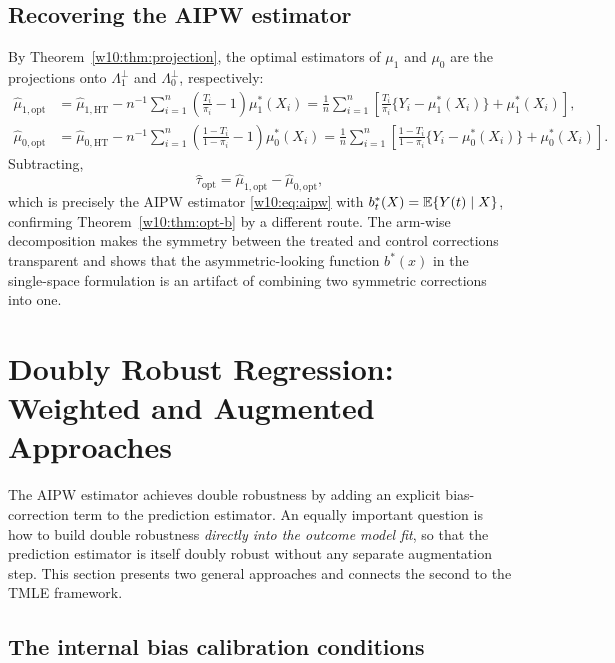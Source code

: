 \documentclass[master.tex]{subfiles}
\begin{document}
\subsection{Recovering the AIPW estimator}
\label{w10:subsec:proj-recover}

By Theorem~\ref{w10:thm:projection}, the optimal estimators of
$\mu_1$ and $\mu_0$ are the projections onto $\Lambda_1^\perp$ and
$\Lambda_0^\perp$, respectively:
\begin{align*}
  \hat\mu_{1,\mathrm{opt}}
  &= \hat\mu_{1,\mathrm{HT}}
     - n^{-1}\!\sum_{i=1}^n\!\left(\frac{T_i}{\pi_i}-1\right)\mu_1^*(X_i)
   = \frac{1}{n}\sum_{i=1}^n
     \left[\frac{T_i}{\pi_i}\{Y_i-\mu_1^*(X_i)\}+\mu_1^*(X_i)\right], \\
  \hat\mu_{0,\mathrm{opt}}
  &= \hat\mu_{0,\mathrm{HT}}
     - n^{-1}\!\sum_{i=1}^n\!\left(\frac{1-T_i}{1-\pi_i}-1\right)\mu_0^*(X_i)
   = \frac{1}{n}\sum_{i=1}^n
     \left[\frac{1-T_i}{1-\pi_i}\{Y_i-\mu_0^*(X_i)\}+\mu_0^*(X_i)\right].
\end{align*}
Subtracting,
\[
  \hat\tau_{\mathrm{opt}}
  = \hat\mu_{1,\mathrm{opt}} - \hat\mu_{0,\mathrm{opt}},
\]
which is precisely the AIPW estimator \eqref{w10:eq:aipw} with
$b_t^*(X) = \mathbb{E}\{Y(t)\mid X\}$, confirming
Theorem~\ref{w10:thm:opt-b} by a different route.  The arm-wise
decomposition makes the symmetry between the treated and control
corrections transparent and shows that the asymmetric-looking
function $b^*(x)$ in the single-space formulation is an artifact of
combining two symmetric corrections into one.

\section{Doubly Robust Regression: Weighted and Augmented Approaches}
\label{w10:sec:ibc}

The AIPW estimator achieves double robustness by adding an explicit
bias-correction term to the prediction estimator.  An equally
important question is how to build double robustness \emph{directly
into the outcome model fit}, so that the prediction estimator is
itself doubly robust without any separate augmentation step.  This
section presents two general approaches and connects the second to
the TMLE framework.

\subsection{The internal bias calibration conditions}
\label{w10:subsec:ibc-conditions}
\end{document}
